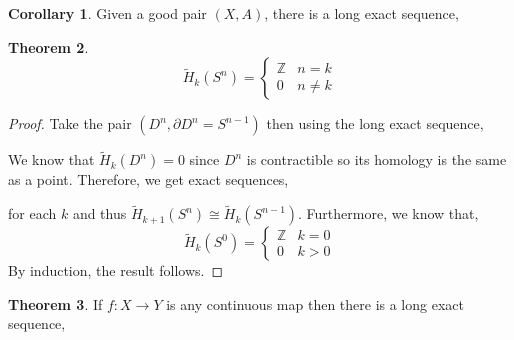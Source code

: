 \documentclass[12pt]{extarticle}
\newcommand{\Z}{\mathbb{Z}}
\theoremstyle{definition}
\newtheorem{theorem}{Theorem}[section]
\newtheorem{corollary}[theorem]{Corollary}
\begin{document}
\begin{corollary}
Given a good pair $(X, A)$, there is a long exact sequence,
\begin{center}
\end{center} 
\end{corollary}

\begin{theorem}
\[\tilde{H}_k(S^n) =
\begin{cases}
\Z & n = k \\
0 & n \neq k
\end{cases}\]
\end{theorem}

\begin{proof}
Take the pair $(D^n, \partial D^n = S^{n-1})$ then using the long exact sequence,
\begin{center}
\end{center} 
We know that $\tilde{H}_k(D^n) = 0$ since $D^n$ is contractible so its homology is the same as a point. Therefore, we get exact sequences,
\begin{center}
\end{center} 
for each $k$ and thus $\tilde{H}_{k+1}(S^n) \cong \tilde{H}_k(S^{n-1})$. Furthermore, we know that,
\[ \tilde{H}_k(S^0) = 
\begin{cases}
\Z & k = 0 \\
0 & k > 0 
\end{cases}\]
By induction, the result follows.
\end{proof}

\begin{theorem}
If $f : X \to Y$ is any continuous map then there is a long exact sequence,
\begin{center}
\end{center}
\end{theorem}
\end{document}
